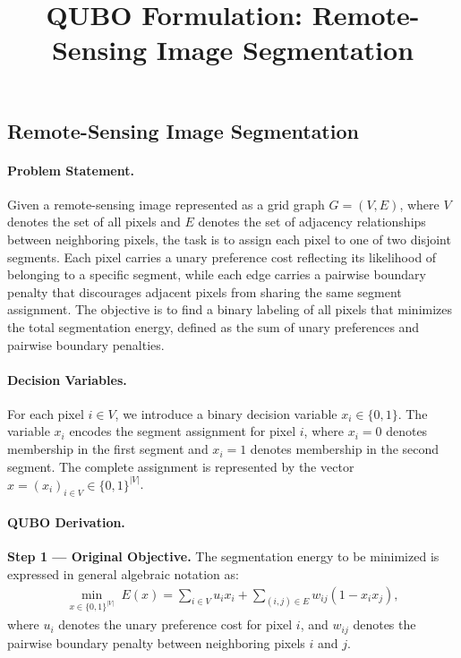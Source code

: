 \documentclass[12pt]{article}
\title{QUBO Formulation: Remote-Sensing Image Segmentation}
\date{}
\begin{document}
\maketitle

\subsection*{Remote-Sensing Image Segmentation}

\paragraph{Problem Statement.}
Given a remote-sensing image represented as a grid graph $G = (V, E)$, where $V$ denotes the set of all pixels and $E$ denotes the set of adjacency relationships between neighboring pixels, the task is to assign each pixel to one of two disjoint segments. Each pixel carries a unary preference cost reflecting its likelihood of belonging to a specific segment, while each edge carries a pairwise boundary penalty that discourages adjacent pixels from sharing the same segment assignment. The objective is to find a binary labeling of all pixels that minimizes the total segmentation energy, defined as the sum of unary preferences and pairwise boundary penalties.

\paragraph{Decision Variables.}
For each pixel $i \in V$, we introduce a binary decision variable $x_i \in \{0,1\}$. The variable $x_i$ encodes the segment assignment for pixel $i$, where $x_i = 0$ denotes membership in the first segment and $x_i = 1$ denotes membership in the second segment. The complete assignment is represented by the vector $x = (x_i)_{i \in V} \in \{0,1\}^{|V|}$.

\paragraph{QUBO Derivation.}
\textbf{Step 1 --- Original Objective.}
The segmentation energy to be minimized is expressed in general algebraic notation as:
\begin{align}
    \min_{x \in \{0,1\}^{|V|}} \; E(x) = \sum_{i \in V} u_i x_i + \sum_{(i,j) \in E} w_{ij} (1 - x_i x_j),
\end{align}
where $u_i$ denotes the unary preference cost for pixel $i$, and $w_{ij}$ denotes the pairwise boundary penalty between neighboring pixels $i$ and $j$.
\end{document}
